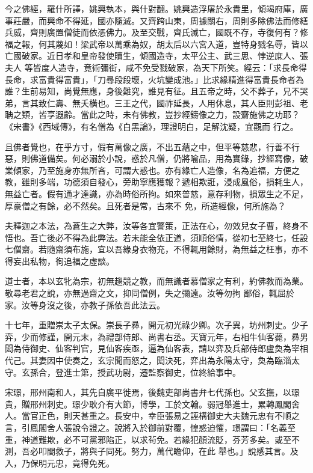 \begin{pinyinscope}
 今之佛經，羅什所譯，姚興執本，與什對翻。姚興造浮屠於永貴里，傾竭府庫，廣事莊嚴，而興命不得延，國亦隨滅。又齊跨山東，周據關右，周則多除佛法而修繕兵威，齊則廣置僧徒而依憑佛力。及至交戰，齊氏滅亡，國既不存，寺復何有？修福之報，何其蔑如！梁武帝以萬乘為奴，胡太后以六宮入道，豈特身戮名辱，皆以亡國破家。近日孝和皇帝發使贖生，傾國造寺，太平公主、武三思、悖逆庶人、張夫人
 等皆度人造寺，竟術彌街，咸不免受戮破家，為天下所笑。經云：「求長命得長命，求富貴得富貴」，「刀尋段段壞，火坑變成池。」比求緣精進得富貴長命者為誰？生前易知，尚覺無應，身後難究，誰見有征。且五帝之時，父不葬子，兄不哭弟，言其致仁壽、無夭橫也。三王之代，國祚延長，人用休息，其人臣則彭祖、老聃之類，皆享遐齡。當此之時，未有佛教，豈抄經鑄像之力，設齋施佛之功耶？《宋書》《西域傳》，有名僧為《白黑論》，理證明白，足解沈疑，宜觀而
 行之。



 且佛者覺也，在乎方寸，假有萬像之廣，不出五蘊之中，但平等慈悲，行善不行惡，則佛道備矣。何必溺於小說，惑於凡僧，仍將喻品，用為實錄，抄經寫像，破業傾家，乃至施身亦無所吝，可謂大惑也。亦有緣亡人造像，名為追福，方便之教，雖則多端，功德須自發心，旁助寧應獲報？遞相欺誑，浸成風俗，損耗生人，無益亡者。假有通才達識，亦為時俗所拘。如來普慈，意存利物，損眾生之不足，厚豪僧之有餘，必不然矣。且死者是常，古來不
 免，所造經像，何所施為？



 夫釋迦之本法，為蒼生之大弊，汝等各宜警策，正法在心，勿效兒女子曹，終身不悟也。吾亡後必不得為此弊法。若未能全依正道，須順俗情，從初七至終七，任設七僧齋。若隨齋須布施，宜以吾緣身衣物充，不得輒用餘財，為無益之枉事，亦不得妄出私物，徇追福之虛談。



 道士者，本以玄牝為宗，初無趨競之教，而無識者慕僧家之有利，約佛教而為業。敬尋老君之說，亦無過齋之文，抑同僧例，失之彌遠。汝等勿拘
 鄙俗，輒屈於家。汝等身沒之後，亦教子孫依吾此法云。



 十七年，重贈崇太子太保。崇長子彞，開元初光祿少卿。次子異，坊州刺史。少子弈，少而修謹，開元末，為禮部侍郎、尚書右丞。天寶元年，右相牛仙客薨，彞男閎為侍御史、仙客判官，見仙客疾亟，逼為仙客表，請以弈及兵部侍郎盧奐為宰相代己。其妻因中使奏之，玄宗聞而怒之，閎決死，弈出為永陽太守，奐為臨淄太守。玄孫合，登進士第，授武功尉，遷監察御史，位終給事中。



 宋璟，邢州南和人，其先自廣平徙焉，後魏吏部尚書弁七代孫也。父玄撫，以璟貴，贈邢州刺史。璟少耿介有大節，博學，工於文翰。弱冠舉進士，累轉鳳閣舍人。當官正色，則天甚重之。長安中，幸臣張易之誣構御史大夫魏元忠有不順之言，引鳳閣舍人張說令證之。說將入於御前對覆，惶惑迫懼，璟謂曰：「名義至重，神道難欺，必不可黨邪陷正，以求茍免。若緣犯顏流貶，芬芳多矣。或至不測，吾必叩閤救子，將與子同死。努力，萬代瞻仰，在此
 舉也。」說感其言。及入，乃保明元忠，竟得免死。




\end{pinyinscope}
